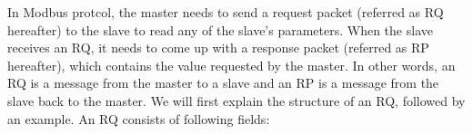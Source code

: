 

In Modbus protcol, the master needs to send a request packet (referred as RQ hereafter) 
to the slave to read any of the slave's parameters. When the 
slave receives an RQ, it needs to come up with a response packet 
(referred as RP hereafter), which contains the value requested 
by the master. In other words, an RQ is a message from the 
master to a slave and an RP is a message from the slave back to the 
master. We will first explain the structure of an RQ, followed by an example. 
An RQ consists of following fields:
